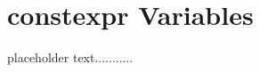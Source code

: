 \newpage
\section[{\ttfamily constexpr} Variables]{{\SecCode constexpr} Variables}\label{constexprvar}

placeholder text...........


